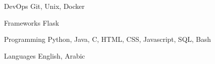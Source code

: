 

\begin{cvskills}


  \cvskill
    {DevOps} %
    {Git, Unix, Docker} %

  \cvskill
    {Frameworks} %
    {Flask} %

  \cvskill
    {Programming} %
    {Python, Java, C, HTML, CSS, Javascript, SQL, Bash} %

  \cvskill
    {Languages} %
    {English, Arabic} %

\end{cvskills}
